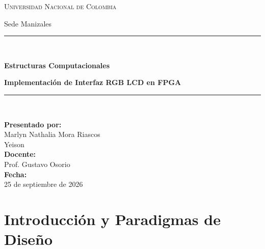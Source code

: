 \documentclass[12pt, letterpaper]{article}
\begin{document}
\begin{titlepage}
    \centering
    \vspace*{1.5cm}
    
    {\scshape\Large Universidad Nacional de Colombia \par}
    \vspace{0.3cm}
    {\large Sede Manizales \par}
    
    \vspace{2.5cm}
    \rule{\linewidth}{0.8pt} \\[0.4cm]
    {\Huge \bfseries\color{brandBlue} Estructuras Computacionales \par}
    \vspace{0.4cm}
    {\Large \bfseries\color{darkText} Implementación de Interfaz RGB LCD en FPGA \par}
    \rule{\linewidth}{0.8pt} \\[2cm]
    
    \vfill
    
    \begin{minipage}{0.8\textwidth}
        \centering
        \textbf{Presentado por:}\\[0.3em]
        {\large Marlyn Nathalia Mora Riascos}\\[0.2em]
        {\large Yeison}\\[1.5cm]
        
        \textbf{Docente:}\\[0.3em]
        {\large Prof. Gustavo Osorio}\\[1.5cm]
        
        \textbf{Fecha:}\\[0.3em]
        25 de septiembre de 2026
    \end{minipage}
    
    \vspace*{1.5cm}
\end{titlepage}

\newpage

\section{Introducción y Paradigmas de Diseño}
\end{document}
